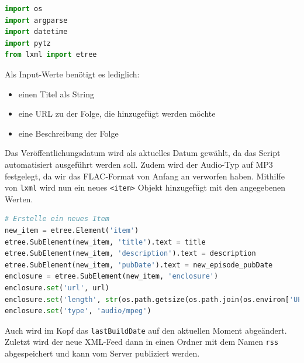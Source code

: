 \documentclass{article}
\begin{document}
\begin{lstlisting}[language=Python, caption=RSS-Feed Generator imports]
import os
import argparse
import datetime
import pytz
from lxml import etree
\end{lstlisting}

Als Input-Werte benötigt es lediglich:

\begin{itemize}
    \item einen Titel als String
    \item eine URL zu der Folge, die hinzugefügt werden möchte
    \item eine Beschreibung der Folge
\end{itemize}

Das Veröffentlichungsdatum wird als aktuelles Datum gewählt, da das Script automatisiert ausgeführt werden soll. Zudem wird der Audio-Typ auf MP3 festgelegt, da wir das FLAC-Format von Anfang an verworfen haben. Mithilfe von \texttt{lxml} wird nun ein neues \texttt{<item>} Objekt hinzugefügt mit den angegebenen Werten.

\begin{lstlisting}[language=Python, caption=Erstellen eines neuen Feed-Items]
# Erstelle ein neues Item
new_item = etree.Element('item')
etree.SubElement(new_item, 'title').text = title
etree.SubElement(new_item, 'description').text = description
etree.SubElement(new_item, 'pubDate').text = new_episode_pubDate
enclosure = etree.SubElement(new_item, 'enclosure')
enclosure.set('url', url)
enclosure.set('length', str(os.path.getsize(os.path.join(os.environ['UPLOAD_PATH'], os.path.basename(url)))))
enclosure.set('type', 'audio/mpeg')
\end{lstlisting}

Auch wird im Kopf das \texttt{lastBuildDate} auf den aktuellen Moment abgeändert. Zuletzt wird der neue XML-Feed dann in einen Ordner mit dem Namen \texttt{rss} abgespeichert und kann vom Server publiziert werden.
\end{document}
